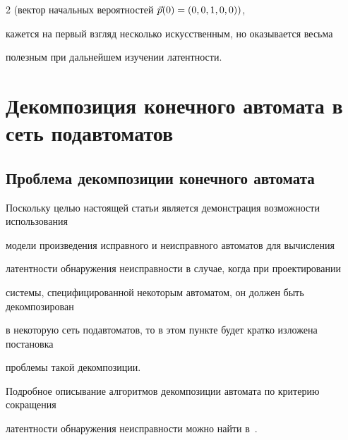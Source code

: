 \begin{multicols}{2}
(вектор начальных вероятностей $\vec p(0)=(0,0,1,0,0))$,


кажется на первый взгляд несколько искусственным, но оказывается весьма


полезным при дальнейшем изучении латентности.










\vspace*{-6pt}




\section{Декомпозиция конечного автомата в сеть подавтоматов}





\vspace*{-3pt}







\subsection{Проблема декомпозиции конечного автомата}


\vspace*{-1pt}





Поскольку целью настоящей статьи является демонстрация возможности использования


модели произведения исправного и неисправного автоматов для вычисления


латентности обнаружения неисправности в случае, когда при проектировании


системы, специфицированной некоторым автоматом, он должен быть декомпозирован


в некоторую сеть подавтоматов, то в этом пункте будет кратко изложена постановка


проблемы такой декомпозиции.


Подробное описывание алгоритмов декомпозиции автомата по критерию сокращения


латентности обнаружения неисправности можно найти в~\cite{6}.






\end{multicols}
